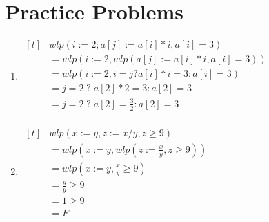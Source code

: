 \documentclass{article}
\author{\hmwkAuthorName}
\date{}
\begin{document}
	
	
	\section{Practice Problems}
	
		\begin{enumerate}[label={(\alph*)}]
			
			\item
			$\begin{aligned}[t]
				&wlp(i := 2; a[j] := a[i] * i, a[i] = 3) \\
				&= wlp(i := 2, wlp(a[j] := a[i] * i, a[i] = 3)) \\ 
				&= wlp(i := 2, i = j ? a[i] * i = 3 : a[i] = 3) \\
				&= j = 2 \; ? \; a[2] * 2 = 3 : a[2] = 3 \\
				&= j = 2 \; ? \; a[2] = \tfrac{3}{2} : a[2] = 3 \\
			\end{aligned}$
			
			\item
			$\begin{aligned}[t]
				&wlp(x := y, z := x / y, z \geq 9) \\
				&= wlp(x := y, wlp (z := \tfrac{x}{y}, z \geq 9)) \\
				&= wlp(x := y, \tfrac{x}{y} \geq 9) \\
				&= \tfrac{y}{y} \geq 9 \\
				&= 1 \geq 9 \\
				&= F
			\end{aligned}$
			
		\end{enumerate}
	
\end{document}
